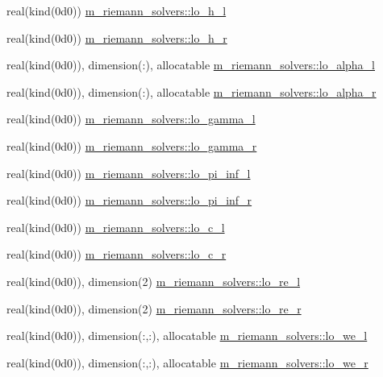 \begin{Indent}
\begin{DoxyCompactItemize}
\item 
real(kind(0d0)) \hyperlink{namespacem__riemann__solvers_a75cca68e31742083e0ebbef418300c78}{m\+\_\+riemann\+\_\+solvers\+::lo\+\_\+h\+\_\+l}
\item 
real(kind(0d0)) \hyperlink{namespacem__riemann__solvers_a985a98321338d51bc8a43695b490b102}{m\+\_\+riemann\+\_\+solvers\+::lo\+\_\+h\+\_\+r}
\item 
real(kind(0d0)), dimension(\+:), allocatable \hyperlink{namespacem__riemann__solvers_a57eb3b7013680ab3c30a1e8f049a0402}{m\+\_\+riemann\+\_\+solvers\+::lo\+\_\+alpha\+\_\+l}
\item 
real(kind(0d0)), dimension(\+:), allocatable \hyperlink{namespacem__riemann__solvers_a89059f36a5b3db54b3bd35cc3215a4be}{m\+\_\+riemann\+\_\+solvers\+::lo\+\_\+alpha\+\_\+r}
\item 
real(kind(0d0)) \hyperlink{namespacem__riemann__solvers_aa0a0c169528cc9c4a379f641fb653712}{m\+\_\+riemann\+\_\+solvers\+::lo\+\_\+gamma\+\_\+l}
\item 
real(kind(0d0)) \hyperlink{namespacem__riemann__solvers_a48b0505675e2bd1d0b36bda9de508655}{m\+\_\+riemann\+\_\+solvers\+::lo\+\_\+gamma\+\_\+r}
\item 
real(kind(0d0)) \hyperlink{namespacem__riemann__solvers_a1cfaf511a3605cef96d95b88de661071}{m\+\_\+riemann\+\_\+solvers\+::lo\+\_\+pi\+\_\+inf\+\_\+l}
\item 
real(kind(0d0)) \hyperlink{namespacem__riemann__solvers_a5e682fb9d377f50935dfbe4d5dd67120}{m\+\_\+riemann\+\_\+solvers\+::lo\+\_\+pi\+\_\+inf\+\_\+r}
\item 
real(kind(0d0)) \hyperlink{namespacem__riemann__solvers_af060aa45ac1c0c96428fd428ca3f63af}{m\+\_\+riemann\+\_\+solvers\+::lo\+\_\+c\+\_\+l}
\item 
real(kind(0d0)) \hyperlink{namespacem__riemann__solvers_ad056500eedb3761b13485edb94ec773e}{m\+\_\+riemann\+\_\+solvers\+::lo\+\_\+c\+\_\+r}
\item 
real(kind(0d0)), dimension(2) \hyperlink{namespacem__riemann__solvers_abbde404883793a9aae3708896b4a2781}{m\+\_\+riemann\+\_\+solvers\+::lo\+\_\+re\+\_\+l}
\item 
real(kind(0d0)), dimension(2) \hyperlink{namespacem__riemann__solvers_a6d89cb45833bdcb48f3f1b01badaedcf}{m\+\_\+riemann\+\_\+solvers\+::lo\+\_\+re\+\_\+r}
\item 
real(kind(0d0)), dimension(\+:,\+:), allocatable \hyperlink{namespacem__riemann__solvers_a8388f446036552682910bbe06da81f70}{m\+\_\+riemann\+\_\+solvers\+::lo\+\_\+we\+\_\+l}
\item 
real(kind(0d0)), dimension(\+:,\+:), allocatable \hyperlink{namespacem__riemann__solvers_a7883028b185740c1d507b486eceef969}{m\+\_\+riemann\+\_\+solvers\+::lo\+\_\+we\+\_\+r}
\end{DoxyCompactItemize}
\end{Indent}
